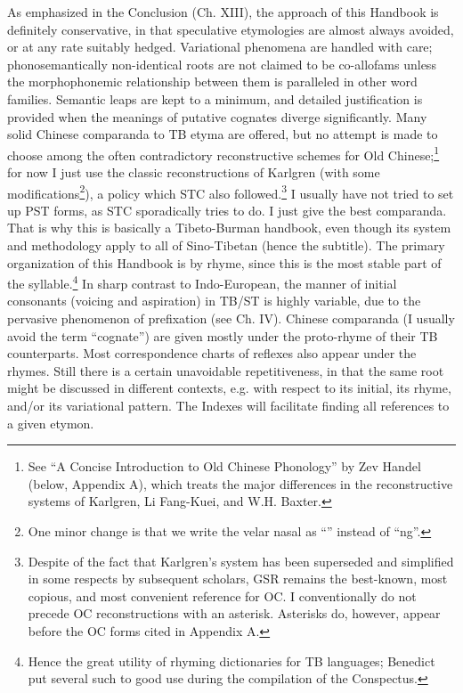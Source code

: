 As emphasized in the Conclusion (Ch. XIII), the approach of this Handbook is definitely conservative, in that speculative etymologies are almost always avoided, or at any rate suitably hedged. Variational phenomena are handled with care; phonosemantically non-identical roots are not claimed to be co-allofams unless the morphophonemic relationship between them is paralleled in other word families. Semantic leaps are kept to a minimum, and detailed justification is provided when the meanings of putative cognates diverge significantly. Many solid Chinese comparanda to TB etyma are offered, but no attempt is made to choose among the often contradictory reconstructive schemes for Old Chinese;\footnote{See ``A Concise Introduction to Old Chinese Phonology'' by Zev Handel (below, Appendix A), which treats the major differences in the reconstructive systems of Karlgren, Li Fang-Kuei, and W.H. Baxter.} for now I just use the classic reconstructions of Karlgren (with some modifications\footnote{One minor change is that we write the velar nasal as ``{\ng}'' instead of ``ng''.}), a policy which STC also followed.\footnote{Despite of the fact that Karlgren's system has been superseded and simplified in some respects by subsequent scholars, GSR remains the best-known, most copious, and most convenient reference for OC. I conventionally do not precede OC reconstructions with an asterisk. Asterisks do, however, appear before the OC forms cited in Appendix A.} I usually have not tried to set up PST forms, as STC sporadically tries to do. I just give the best comparanda. That is why this is basically a Tibeto-Burman handbook, even though its system and methodology apply to all of Sino-Tibetan (hence the subtitle).
The primary organization of this Handbook is by rhyme, since this is the most stable part of the syllable.\footnote{Hence the great utility of rhyming dictionaries for TB languages; Benedict put several such to good use during the compilation of the Conspectus.} In sharp contrast to Indo-European, the manner of initial consonants (voicing and aspiration) in TB/ST is highly variable, due to the pervasive phenomenon of prefixation (see Ch. IV). Chinese comparanda (I usually avoid the term ``cognate'') are given mostly under the proto-rhyme of their TB counterparts. Most correspondence charts of reflexes also appear under the rhymes. Still there is a certain unavoidable repetitiveness, in that the same root might be discussed in different contexts, e.g. with respect to its initial, its rhyme, and/or its variational pattern. The Indexes will facilitate finding all references to a given etymon.
